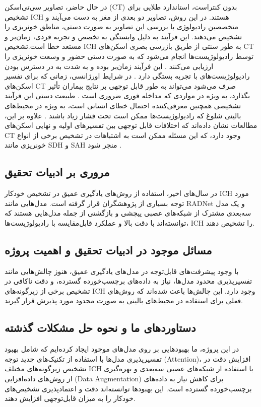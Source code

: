 در حال حاضر، تصاویر سی‌تی‌اسکن (CT) بدون کنتراست، استاندارد طلایی برای تشخیص ICH هستند. در این روش، تصاویر دو بعدی از مغز به دست می‌آیند و متخصصین رادیولوژی با بررسی این تصاویر به صورت دستی، مناطق خونریزی را تشخیص می‌دهند. این فرآیند به دلیل وابستگی به تخصص و تجربه فردی، زمان‌بر و مستعد خطا است.تشخیص ICH به طور سنتی از طریق بازرسی بصری اسکن‌های CT توسط رادیولوژیست‌ها انجام می‌شود که به صورت دستی حضور و وسعت خونریزی را ارزیابی می‌کنند \cite{arbabshirani2018advanced}. این فرآیند زمان‌بر بوده و به شدت به در دسترس بودن رادیولوژیست‌های با تجربه بستگی دارد \cite{burduja2020accurate}. در شرایط اورژانسی، زمانی که برای تفسیر اسکن‌های CT صرف می‌شود می‌تواند به طور قابل توجهی بر نتایج بیماران تأثیر بگذارد، به ویژه در مواردی که مداخله فوری ضروری است \cite{chilamkurthy2018deep}. طبیعت دستی این فرآیند تشخیصی همچنین معرفی‌کننده احتمال خطای انسانی است، به ویژه در محیط‌های بالینی شلوغ که رادیولوژیست‌ها ممکن است تحت فشار زیاد باشند \cite{ye2019precise}. علاوه بر این، مطالعات نشان داده‌اند که اختلافات قابل توجهی بین تفسیرهای اولیه و نهایی اسکن‌های CT وجود دارد، که این مسئله ممکن است به اشتباهات در تشخیص برخی از انواع خونریزی مانند SDH و SAH منجر شود \cite{titano2018automated}.


\subsection*{مروری بر ادبیات تحقیق}

در سال‌های اخیر، استفاده از روش‌های یادگیری عمیق در تشخیص خودکار ICH مورد توجه بسیاری از پژوهشگران قرار گرفته است. مدل‌هایی مانند RADNet \cite{grewal2018radnet} و یک مدل سه‌بعدی مشترک از شبکه‌های عصبی پیچشی و بازگشتی \cite{ye2019precise} از جمله مدل‌هایی هستند که توانسته‌اند با دقت بالا و عملکرد قابل‌مقایسه با رادیولوژیست‌ها، ICH را تشخیص دهند.

\subsection*{مسائل موجود در ادبیات تحقیق و اهمیت پروژه}

با وجود پیشرفت‌های قابل‌توجه در مدل‌های یادگیری عمیق، هنوز چالش‌هایی مانند تفسیرپذیری محدود مدل‌ها، نیاز به داده‌های برچسب‌خورده گسترده، و دقت ناکافی در تشخیص برخی از زیرگونه‌های ICH وجود دارد. این چالش‌ها باعث شده‌اند که روش‌های فعلی برای استفاده در محیط‌های بالینی به صورت محدود مورد پذیرش قرار گیرند.

\subsection*{دستاوردهای ما و نحوه حل مشکلات گذشته}

در این پروژه، ما بهبودهایی بر روی مدل‌های موجود ایجاد کرده‌ایم که شامل بهبود تفسیرپذیری مدل‌ها با استفاده از تکنیک‌های جدید توجه (Attention)، افزایش دقت در تشخیص زیرگونه‌های مختلف ICH با استفاده از شبکه‌های عصبی سه‌بعدی و بهره‌گیری از روش‌های داده‌افزایی (Data Augmentation) برای کاهش نیاز به داده‌های برچسب‌خورده گسترده است. این بهبودها توانسته‌اند دقت و اعتمادپذیری تشخیص‌های خودکار را به میزان قابل‌توجهی افزایش دهند.
